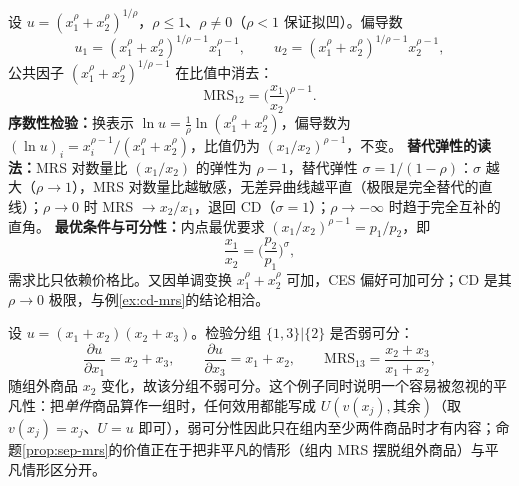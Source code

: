 \begin{example}
\label{ex:ces-mrs}
设 $u=(x_1^{\rho}+x_2^{\rho})^{1/\rho}$，$\rho\le1$、$\rho\ne0$（$\rho<1$ 保证拟凹）。偏导数
\[
 u_1=(x_1^{\rho}+x_2^{\rho})^{1/\rho-1}x_1^{\rho-1},
 \qquad
 u_2=(x_1^{\rho}+x_2^{\rho})^{1/\rho-1}x_2^{\rho-1},
\]
公共因子 $(x_1^{\rho}+x_2^{\rho})^{1/\rho-1}$ 在比值中消去：
\[
 \mathrm{MRS}_{12}=\Big(\frac{x_1}{x_2}\Big)^{\rho-1}.
\]
\textbf{序数性检验：}换表示 $\ln u=\tfrac1\rho\ln(x_1^{\rho}+x_2^{\rho})$，偏导数为 $(\ln u)_i=x_i^{\rho-1}/(x_1^{\rho}+x_2^{\rho})$，比值仍为 $(x_1/x_2)^{\rho-1}$，不变。
\textbf{替代弹性的读法：}MRS 对数量比 $(x_1/x_2)$ 的弹性为 $\rho-1$，替代弹性 $\sigma=1/(1-\rho)$：$\sigma$ 越大（$\rho\to1$），MRS 对数量比越敏感，无差异曲线越平直（极限是完全替代的直线）；$\rho\to0$ 时 MRS $\to x_2/x_1$，退回 CD（$\sigma=1$）；$\rho\to-\infty$ 时趋于完全互补的直角。
\textbf{最优条件与可分性：}内点最优要求 $(x_1/x_2)^{\rho-1}=p_1/p_2$，即
\[
 \frac{x_1}{x_2}=\Big(\frac{p_2}{p_1}\Big)^{\sigma},
\]
需求比只依赖价格比。又因单调变换 $x_1^{\rho}+x_2^{\rho}$ 可加，CES 偏好可加可分；CD 是其 $\rho\to0$ 极限，与例\ref{ex:cd-mrs}的结论相洽。
\end{example}

\begin{example}[一个不可分偏好]
\label{ex:nonsep}
设 $u=(x_1+x_2)(x_2+x_3)$。检验分组 $\{1,3\}|\{2\}$ 是否弱可分：
\[
 \frac{\partial u}{\partial x_1}=x_2+x_3,
 \qquad
 \frac{\partial u}{\partial x_3}=x_1+x_2,
 \qquad
 \mathrm{MRS}_{13}=\frac{x_2+x_3}{x_1+x_2},
\]
随组外商品 $x_2$ 变化，故该分组不弱可分。这个例子同时说明一个容易被忽视的平凡性：把\emph{单件}商品算作一组时，任何效用都能写成 $U(v(x_j),\text{其余})$（取 $v(x_j)=x_j$、$U=u$ 即可），弱可分性因此只在组内至少两件商品时才有内容；命题\ref{prop:sep-mrs}的价值正在于把非平凡的情形（组内 MRS 摆脱组外商品）与平凡情形区分开。
\end{example}
